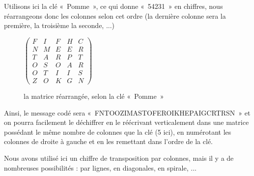 Utilisons ici la clé «~Pomme~», ce qui donne «~54231~» en chiffres,
nous réarrangeons donc les colonnes selon cet ordre (la dernière
colonne sera la première, la troisième la seconde, ...)

\begin{figure}[h]
  \begin{center}
  $
  \left(
    \begin{array}{ccccc}
      F & I & F & H & C \\ 
      N & M & E & E & R \\
      T & A & R & P & T \\
      O & S & O & A & R \\
      O & T & I & I & S \\
      Z & O & K & G & N
    \end{array}
  \right)
  $
  \end{center}
  \caption{la matrice réarrangée, selon la clé «~Pomme~»}
  \label{fig:TranspositionMatriceCode}
\end{figure}

Ainsi, le message codé sera «~FNTOOZIMASTOFEROIKHEPAIGCRTRSN~» et on
pourra facilement le déchiffrer en le réécrivant verticalement dans
une matrice possédant le même nombre de colonnes que la clé (5 ici),
en numérotant les colonnes de droite à gauche et en les remettant dans
l'ordre de la clé.

Nous avons utilisé ici un chiffre de transposition par colonnes, mais
il y a de nombreuses possibilités : par lignes, en diagonales, en
spirale, ...
